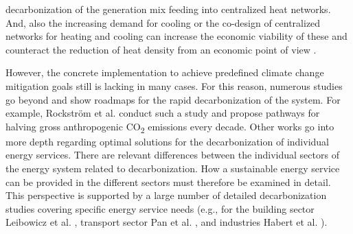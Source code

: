 decarbonization of the generation mix feeding into centralized heat networks. And, also the increasing demand for cooling or the co-design of centralized networks for heating and cooling can increase the economic viability of these and counteract the reduction of heat density from an economic point of view \cite{zhang2021economic}.\newline

However, the concrete implementation to achieve predefined climate change mitigation goals still is lacking in many cases. For this reason, numerous studies go beyond and show roadmaps for the rapid decarbonization of the system. For example, Rockstr{\"o}m et al. \cite{rockstrom2017roadmap} conduct such a study and propose pathways for halving gross anthropogenic CO\textsubscript{2} emissions every decade. Other works go into more depth regarding optimal solutions for the decarbonization of individual energy services. There are relevant differences between the individual sectors of the energy system related to decarbonization. How a sustainable energy service can be provided in the different sectors must therefore be examined in detail. This perspective is supported by a large number of detailed decarbonization studies covering specific energy service needs (e.g., for the building sector Leibowicz et al. \cite{leibowicz2018optimal}, transport sector Pan et al. \cite{pan2018decarbonization}, and industries Habert et al. \cite{habert2020environmental}).\newline

